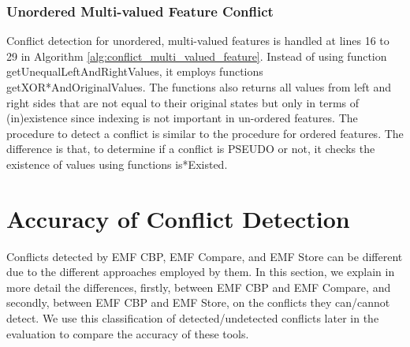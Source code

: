 \subsubsection{Unordered Multi-valued Feature Conflict} 
\label{sec:unordered_conflict}
Conflict detection for unordered, multi-valued features is handled at lines 16 to 29 in Algorithm \ref{alg:conflict_multi_valued_feature}. Instead of using function \textsf{getUnequalLeftAndRightValues}, it employs functions \textsf{getXOR*AndOriginalValues}. The functions also returns all values from left and right sides that are not equal to their original states but only in terms of (in)existence since indexing is not important in un-ordered features. The procedure to detect a conflict is similar to the procedure for ordered features. The difference is that, to determine if a conflict is \textsf{PSEUDO} or not, it checks the existence of values using functions \textsf{is*Existed}.

\section{Accuracy of Conflict Detection}
\label{sec:accuracy_of_conflict_detection}
Conflicts detected by EMF CBP, EMF Compare, and EMF Store can be different due to the different approaches employed by them. In this section, we explain in more detail the differences, firstly, between EMF CBP and EMF Compare, and secondly, between EMF CBP and EMF Store, on the conflicts they can/cannot detect. We use this classification of detected/undetected conflicts later in the evaluation to compare the accuracy of these tools.

